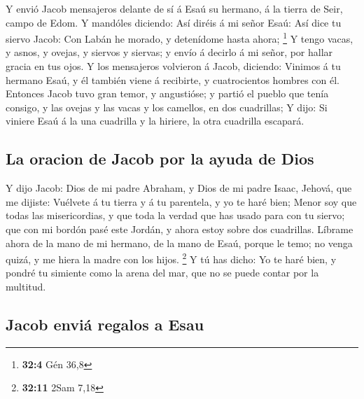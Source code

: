  Y envió Jacob mensajeros delante de sí á Esaú su hermano, á
la tierra de Seir, campo de Edom.  Y mandóles diciendo: Así
diréis á mi señor Esaú: Así dice tu siervo Jacob: Con Labán he morado, y
detenídome hasta ahora; \footnote{\textbf{32:4} Gén 36,8}  Y
tengo vacas, y asnos, y ovejas, y siervos y siervas; y envío á decirlo á
mi señor, por hallar gracia en tus ojos.  Y los mensajeros
volvieron á Jacob, diciendo: Vinimos á tu hermano Esaú, y él también
viene á recibirte, y cuatrocientos hombres con él.  Entonces
Jacob tuvo gran temor, y angustióse; y partió el pueblo que tenía
consigo, y las ovejas y las vacas y los camellos, en dos cuadrillas;
 Y dijo: Si viniere Esaú á la una cuadrilla y la hiriere, la
otra cuadrilla escapará.

\hypertarget{la-oracion-de-jacob-por-la-ayuda-de-dios}{%
\subsection{La oracion de Jacob por la ayuda de
Dios}\label{la-oracion-de-jacob-por-la-ayuda-de-dios}}

 Y dijo Jacob: Dios de mi padre Abraham, y Dios de mi padre
Isaac, Jehová, que me dijiste: Vuélvete á tu tierra y á tu parentela, y
yo te haré bien;  Menor soy que todas las misericordias, y
que toda la verdad que has usado para con tu siervo; que con mi bordón
pasé este Jordán, y ahora estoy sobre dos cuadrillas. 
Líbrame ahora de la mano de mi hermano, de la mano de Esaú, porque le
temo; no venga quizá, y me hiera la madre con los hijos. \footnote{\textbf{32:11}
  2Sam 7,18}  Y tú has dicho: Yo te haré bien, y pondré tu
simiente como la arena del mar, que no se puede contar por la multitud.

\hypertarget{jacob-enviuxe1-regalos-a-esau}{%
\subsection{Jacob enviá regalos a
Esau}\label{jacob-enviuxe1-regalos-a-esau}}

